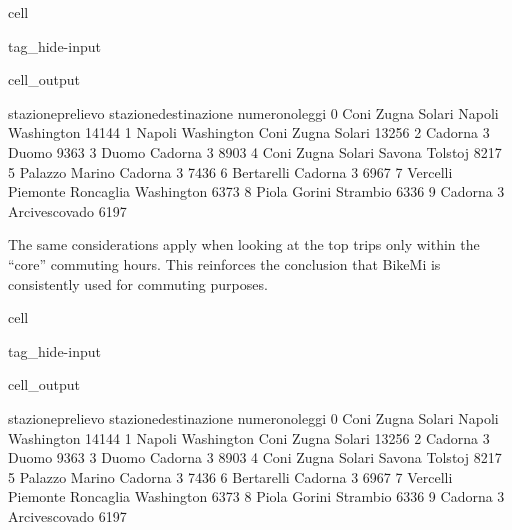 \documentclass[letterpaper,10pt,english]{jupyterBook}
\begin{document}
\begin{sphinxuseclass}{cell}
\begin{sphinxuseclass}{tag_hide-input}
\begin{sphinxuseclass}{cell_output}
\begin{sphinxVerbatim}[commandchars=\\\{\}]
     stazione\PYGZus{}prelievo   stazione\PYGZus{}destinazione  numero\PYGZus{}noleggi
0    Coni Zugna Solari     Napoli \PYGZhy{} Washington           14144
1  Napoli \PYGZhy{} Washington       Coni Zugna Solari           13256
2            Cadorna 3                   Duomo            9363
3                Duomo               Cadorna 3            8903
4    Coni Zugna Solari        Savona \PYGZhy{} Tolstoj            8217
5       Palazzo Marino               Cadorna 3            7436
6           Bertarelli               Cadorna 3            6967
7  Vercelli \PYGZhy{} Piemonte  Roncaglia \PYGZhy{} Washington            6373
8                Piola       Gorini \PYGZhy{} Strambio            6336
9            Cadorna 3           Arcivescovado            6197
\end{sphinxVerbatim}

\end{sphinxuseclass}
\end{sphinxuseclass}
\end{sphinxuseclass}
\sphinxAtStartPar
The same considerations apply when looking at the top trips only within the “core” commuting hours. This reinforces the conclusion that BikeMi is consistently used for commuting purposes.

\begin{sphinxuseclass}{cell}
\begin{sphinxuseclass}{tag_hide-input}
\begin{sphinxuseclass}{cell_output}
\begin{sphinxVerbatim}[commandchars=\\\{\}]
     stazione\PYGZus{}prelievo   stazione\PYGZus{}destinazione  numero\PYGZus{}noleggi
0    Coni Zugna Solari     Napoli \PYGZhy{} Washington           14144
1  Napoli \PYGZhy{} Washington       Coni Zugna Solari           13256
2            Cadorna 3                   Duomo            9363
3                Duomo               Cadorna 3            8903
4    Coni Zugna Solari        Savona \PYGZhy{} Tolstoj            8217
5       Palazzo Marino               Cadorna 3            7436
6           Bertarelli               Cadorna 3            6967
7  Vercelli \PYGZhy{} Piemonte  Roncaglia \PYGZhy{} Washington            6373
8                Piola       Gorini \PYGZhy{} Strambio            6336
9            Cadorna 3           Arcivescovado            6197
\end{sphinxVerbatim}

\end{sphinxuseclass}
\end{sphinxuseclass}
\end{sphinxuseclass}
\end{document}
